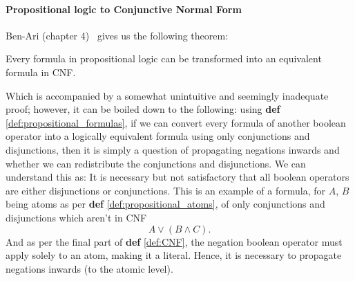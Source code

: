\paragraph{Propositional logic to Conjunctive Normal Form}
Ben-Ari (chapter 4)~\cite{Math-Logic-for-CompSci} gives us the following theorem:
\begin{theorem}\label{thm:CNF_conversion}
    Every formula in propositional logic can be transformed into an equivalent formula in CNF.
\end{theorem}
Which is accompanied by a somewhat unintuitive and seemingly inadequate proof; however, it can be boiled down to the following: using \textbf{def} \ref{def:propositional_formulas}, if we can convert every formula of another boolean operator into a logically equivalent formula using only conjunctions and disjunctions, then it is simply a question of propagating negations inwards and whether we can redistribute the conjunctions and disjunctions. We can understand this as: It is necessary but not satisfactory that all boolean operators are either disjunctions or conjunctions. This is an example of a formula, for $A$, $B$ being atoms as per \textbf{def} \ref{def:propositional_atoms}, of only conjunctions and disjunctions which aren't in CNF
\begin{equation*}
    A \vee (B \wedge C).
\end{equation*}
And as per the final part of \textbf{def} \ref{def:CNF}, the negation boolean operator must apply solely to an atom, making it a literal. Hence, it is necessary to propagate negations inwards (to the atomic level).
